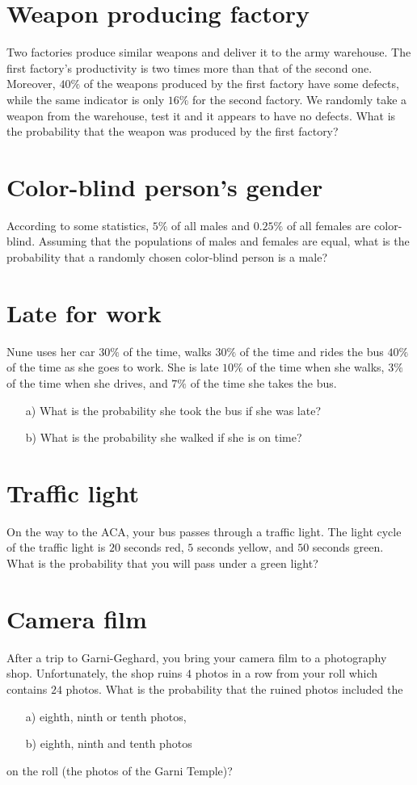 \section{Weapon producing factory}
Two factories produce similar weapons and deliver it to the army warehouse. The first factory’s productivity is two times more than that of
the second one. Moreover, $40\%$ of the weapons produced by the first
factory have some defects, while the same indicator is only $16\%$ for
the second factory. We randomly take a weapon from the warehouse,
test it and it appears to have no defects. What is the probability that
the weapon was produced by the first factory?

\section{Color-blind person's gender}
According to some statistics, $5\%$ of all males and $0.25\%$ of all females
are color-blind. Assuming that the populations of males and females
are equal, what is the probability that a randomly chosen color-blind person is a male?

\section{Late for work}
Nune uses her car $30\%$ of the time, walks $30\%$ of the time and rides the bus $40\%$ of the time as she goes to work. She is late $10\%$ of the time when she walks, $3\%$ of the time when she drives, and $7\%$ of the time she takes the bus.

\begin{enumerate}
\item[a) ] What is the probability she took the bus if she was late?

\item[b) ] What is the probability she walked if she is on time?
\end{enumerate}


\section{Traffic light}
On the way to the ACA, your
bus passes through a traffic light. The light cycle of the traffic light is $20$
seconds red, $5$ seconds yellow, and $50$ seconds green. What is the
probability that you will pass under a green light?

\section{Camera film}
After a trip to Garni-Geghard, you bring your camera film to a photography shop. Unfortunately, the shop ruins $4$ photos in a row from your roll which contains $24$ photos. What is the probability that the ruined photos included the
\begin{enumerate}
    \item[a) ] eighth, ninth or tenth photos,
    \item[b) ] eighth, ninth and tenth photos
\end{enumerate}
on the roll (the photos of the Garni Temple)?

